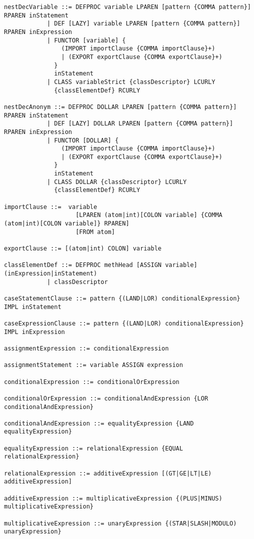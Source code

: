 \begin{lstlisting}[label={lst:newOzEBNF},language=ebnf]
nestDecVariable ::= DEFPROC variable LPAREN [pattern {COMMA pattern}] RPAREN inStatement
            | DEF [LAZY] variable LPAREN [pattern {COMMA pattern}] RPAREN inExpression
            | FUNCTOR [variable] {
                (IMPORT importClause {COMMA importClause}+)
                | (EXPORT exportClause {COMMA exportClause}+)
              }
              inStatement
            | CLASS variableStrict {classDescriptor} LCURLY
              {classElementDef} RCURLY

nestDecAnonym ::= DEFPROC DOLLAR LPAREN [pattern {COMMA pattern}] RPAREN inStatement
            | DEF [LAZY] DOLLAR LPAREN [pattern {COMMA pattern}] RPAREN inExpression
            | FUNCTOR [DOLLAR] {
                (IMPORT importClause {COMMA importClause}+)
                | (EXPORT exportClause {COMMA exportClause}+)
              }
              inStatement
            | CLASS DOLLAR {classDescriptor} LCURLY
              {classElementDef} RCURLY

importClause ::=  variable
                    [LPAREN (atom|int)[COLON variable] {COMMA (atom|int)[COLON variable]} RPAREN]
                    [FROM atom]

exportClause ::= [(atom|int) COLON] variable

classElementDef ::= DEFPROC methHead [ASSIGN variable] (inExpression|inStatement)
            | classDescriptor

caseStatementClause ::= pattern {(LAND|LOR) conditionalExpression} IMPL inStatement

caseExpressionClause ::= pattern {(LAND|LOR) conditionalExpression} IMPL inExpression

assignmentExpression ::= conditionalExpression

assignmentStatement ::= variable ASSIGN expression

conditionalExpression ::= conditionalOrExpression

conditionalOrExpression ::= conditionalAndExpression {LOR conditionalAndExpression}

conditionalAndExpression ::= equalityExpression {LAND equalityExpression}

equalityExpression ::= relationalExpression {EQUAL relationalExpression}

relationalExpression ::= additiveExpression [(GT|GE|LT|LE) additiveExpression]

additiveExpression ::= multiplicativeExpression {(PLUS|MINUS) multiplicativeExpression}

multiplicativeExpression ::= unaryExpression {(STAR|SLASH|MODULO) unaryExpression}


\end{lstlisting}
